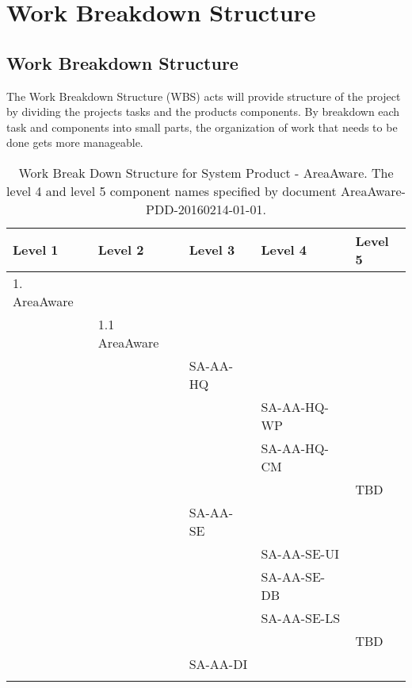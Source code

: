 \section{Work Breakdown Structure}
\subsection{Work Breakdown Structure}
The Work Breakdown Structure (WBS) acts will provide structure of the project by dividing the projects tasks and the products components.
By breakdown each task and components into small parts, the organization of work that needs to be done gets more manageable.
\begin{table}[]
\centering
\caption{Work Break Down Structure for System Product - AreaAware. The level 4 and level 5 component names specified by document AreaAware-PDD-20160214-01-01.}
\label{tab:wbs_sysproduct}
\begin{tabular}{lllll}\hline
Level 1 & Level 2 & Level 3 & Level 4 & Level 5 \\\hline
1. AreaAware   &             &           &             &         \\
            & 1.1 AreaAware  &           &             &         \\
            &                &  SA-AA-HQ &             &         \\
            &                &           & SA-AA-HQ-WP &         \\
            &                &           & SA-AA-HQ-CM &         \\
            &                &           &             & TBD     \\
            &                &  SA-AA-SE &             &         \\
            &                &           & SA-AA-SE-UI &         \\
            &                &           & SA-AA-SE-DB &         \\
            &                &           & SA-AA-SE-LS &         \\
            &                &           &             & TBD     \\
            &                &  SA-AA-DI &             &         \\
            &                &           &             &         \\\hline
\end{tabular}
\end{table}


